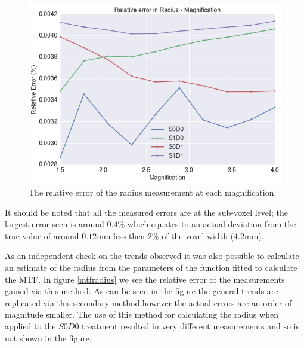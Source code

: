 \documentclass[
  twoside,
  11pt, a4paper,
  footinclude=true,
  headinclude=true,
  cleardoublepage=empty
]{scrbook}
\begin{document}
\begin{figure}[h!]
  \centering
    \includegraphics[width=\textwidth]{code/RadiusMeasurements/Plots_RadiusCentre_files/Plots_RadiusCentre_3_0.png}
    \caption{The relative error of the radius measurement at each magnification.}
        \label{relerrormeasuredradius}
\end{figure}

It should be noted that all the measured errors are at the sub-voxel level; the largest error seen is around $0.4\%$ which equates to an actual deviation from the true value of around $0.12$mm less then $2\%$ of the voxel width ($4.2$mm).

As an independent check on the trends observed it was also possible to calculate an estimate of the radius from the parameters of the function fitted to calculate the MTF. In figure \ref{mtfradius} we see the relative error of the measurements gained via this method. As can be seen in the figure the general trends  are replicated via this secondary method however the actual errors are an order of magnitude smaller. The use of this method for calculating the radius when applied to the $S0D0$ treatment resulted in very different measurements and so is not shown in the figure.
\end{document}
